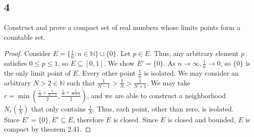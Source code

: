 \documentclass{amsart}
\begin{document}
\subsection*{4} Construct and prove a compact set of real numbers whose limits points form a countable set. 
\begin{proof}
    Consider $E = \{\frac{1}{n}:n\in\mathbb{N}\} \cup \{0\}$. Let $p \in E$. Thus, any arbitrary element $p$ satisfies $0 \le p \le 1$, so $E \subseteq [0,1]$. We show $E' = \{0\}$. As $n \to \infty, \frac{1}{n} \to 0$, so $\{0\}$ is the only limit point of $E$. Every other point $\frac{1}{n}$ is isolated. We may consider an arbitrary $N>2 \in \mathbb{N}$  such that $\frac{1}{N-1} > \frac{1}{N} > \frac{1}{N+1}$. We may take $r = \min(\frac{\frac{1}{N} + \frac{1}{N-1}}{2}, \frac{\frac{1}{N} + \frac{1}{N+1}}{2})$, and we are able to construct a neighborhood $N_r(\frac{1}{N})$ that only contains $\frac{1}{N}$. Thus, each point, other than zero, is isolated. Since $E' = \{0\}, E' \subseteq E$, therefore $E$ is closed. Since $E$ is closed and bounded, $E$ is compact by theorem 2.41. 
\end{proof}
\end{document}
